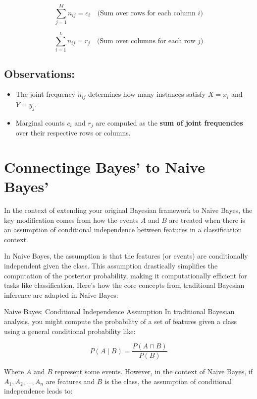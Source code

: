 \documentclass[
  12 pt,
  a4paper,
]{book}
\providecommand{\tightlist}{%
  \setlength{\itemsep}{0pt}\setlength{\parskip}{0pt}}
\numberwithin{equation}{section}
\theoremstyle{plain}      %
\theoremstyle{definition} %
\theoremstyle{remark}     %
\theoremstyle{note}         %
\begin{document}
\[
\sum_{j=1}^{M} n_{ij} = c_i \quad \text{(Sum over rows for each column $i$)} 
\]

\[
\sum_{i=1}^{L} n_{ij} = r_j \quad \text{(Sum over columns for each row $j$)}
\]

\hypertarget{observations}{%
\subsection{Observations:}\label{observations}}

\begin{itemize}
\tightlist
\item
  The joint frequency \(n_{ij}\) determines how many instances satisfy
  \(X = x_i\) and \(Y = y_j\).
\item
  Marginal counts \(c_i\) and \(r_j\) are computed as the \textbf{sum of
  joint frequencies} over their respective rows or columns.
\end{itemize}

\newpage

\newpage

\hypertarget{connectinge-bayes-to-naive-bayes}{%
\section{Connectinge Bayes' to Naive
Bayes'}\label{connectinge-bayes-to-naive-bayes}}

In the context of extending your original Bayesian framework to Naive
Bayes, the key modification comes from how the events \(A\) and \(B\)
are treated when there is an assumption of conditional independence
between features in a classification context.

In Naive Bayes, the assumption is that the features (or events) are
conditionally independent given the class. This assumption drastically
simplifies the computation of the posterior probability, making it
computationally efficient for tasks like classification. Here's how the
core concepts from traditional Bayesian inference are adapted in Naive
Bayes:

Naive Bayes: Conditional Independence Assumption In traditional Bayesian
analysis, you might compute the probability of a set of features given a
class using a general conditional probability like:

\[
P(A \mid B)=\frac{P(A \cap B)}{P(B)}
\]

Where \(A\) and \(B\) represent some events. However, in the context of
Naive Bayes, if \(A_1, A_2, \ldots, A_n\) are features and \(B\) is the
class, the assumption of conditional independence leads to:
\end{document}
